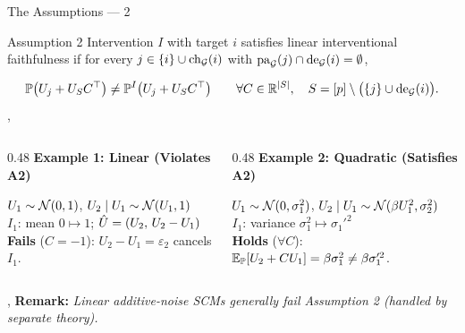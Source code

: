 \begin{frame}{The Assumptions --- 2}
  \vspace{1ex}
  \begin{statement}{Assumption 2}
    Intervention $I$ with target $i$ satisfies linear interventional faithfulness if for every $j \in \{i\} \cup \operatorname{ch}_{\mathcal{G}}(i)$ with $\operatorname{pa}_{\mathcal{G}}(j) \cap \operatorname{de}_{\mathcal{G}}(i) = \emptyset$,
  \end{statement}
  \[
    \mathbb{P}\big(U_j + U_S C^\top\big) \neq \mathbb{P}^I\big(U_j + U_S C^\top\big) \qquad
    \forall C \in \mathbb{R}^{|S|}, \quad S = [p] \setminus \big(\{j\} \cup \operatorname{de}_{\mathcal{G}}(i)\big).
  \]
  \sep\vspace{1.2\baselineskip}
  \begin{columns}[T]
    \begin{column}{0.48\textwidth}
      \centering\textbf{Example 1: Linear (Violates A2)}\par\smallskip
      \par
      \raggedright\small
      $U_1 \sim \mathcal{N}(0,1)$, \; $U_2 \mid U_1 \sim \mathcal{N}(U_1,1)$\\
      $I_1$: mean $0 \mapsto 1$; \; $\hat{U} = (U_2,\, U_2 - U_1)$\\
      \textbf{Fails} ($C = -1$): $U_2 - U_1 = \varepsilon_2$ cancels $I_1$.
    \end{column}
    \begin{column}{0.48\textwidth}
      \centering\textbf{Example 2: Quadratic (Satisfies A2)}\par\smallskip
      \par
      \raggedright\small
      $U_1 \sim \mathcal{N}(0,\sigma_1^2)$, \; $U_2 \mid U_1 \sim \mathcal{N}(\beta U_1^2, \sigma_2^2)$\\
      $I_1$: variance $\sigma_1^2 \mapsto \sigma_1'^2$\\
      \textbf{Holds} ($\forall C$): $\mathbb{E}_{\mathbb{P}}[U_2 + CU_1] = \beta\sigma_1^2 \neq \beta\sigma_1'^2$.
    \end{column}
  \end{columns}
  \sep
  \textbf{Remark:} \emph{Linear additive-noise SCMs generally fail Assumption 2 (handled by separate theory).}
\end{frame}

